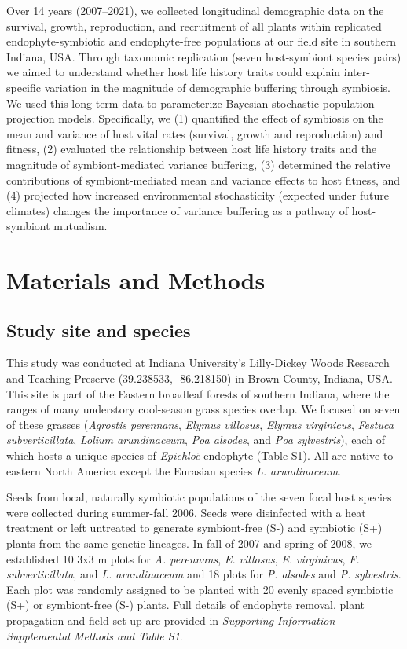 \documentclass[lineno, sn-basic]{sn-jnl}%
\begin{document}
Over 14 years (2007--2021), we collected longitudinal demographic data on the survival, growth, reproduction, and recruitment of all plants within replicated endophyte-symbiotic and endophyte-free populations at our field site in southern Indiana, USA. 
Through taxonomic replication (seven host-symbiont species pairs) we aimed to understand whether host life history traits could explain inter-specific variation in the magnitude of demographic buffering through symbiosis. 
We used this long-term data to parameterize Bayesian stochastic population projection models. 
Specifically, we  (1) quantified the effect of symbiosis on the mean and variance of host vital rates (survival, growth and reproduction) and fitness, (2) evaluated the relationship between host life history traits and the magnitude of symbiont-mediated variance buffering, (3) determined the relative contributions of symbiont-mediated mean and variance effects to host fitness, and (4) projected how increased environmental stochasticity (expected under future climates) changes the importance of variance buffering as a pathway of host-symbiont mutualism. 

\section*{Materials and Methods}
\subsection*{Study site and species}
This study was conducted at Indiana University's Lilly-Dickey Woods Research and Teaching Preserve (39.238533, -86.218150) in Brown County, Indiana, USA. 
This site is part of the Eastern broadleaf forests of southern Indiana, where the ranges of many understory cool-season grass species overlap. 
We focused on seven of these grasses (\emph{Agrostis perennans}, \emph{Elymus villosus}, \emph{Elymus virginicus}, \emph{Festuca subverticillata}, \emph{Lolium arundinaceum}, \emph{Poa alsodes}, and \emph{Poa sylvestris}), each of which hosts a unique species of \emph{Epichlo\"e} endophyte (Table S1). 
All are native to eastern North America except the Eurasian species \emph{L. arundinaceum}.

Seeds from local, naturally symbiotic populations of the seven focal host species were collected during summer-fall 2006. 
Seeds were disinfected with a heat treatment or left untreated to generate symbiont-free (S-) and symbiotic (S+) plants from the same genetic lineages.
In fall of 2007 and spring of 2008, we established 10 3x3 m plots for \emph{A. perennans}, \emph{E. villosus}, \emph{E. virginicus}, \emph{F. subverticillata}, and \emph{L. arundinaceum}  and 18 plots for \emph{P. alsodes} and \emph{P. sylvestris}.
Each plot was randomly assigned to be planted with 20 evenly spaced symbiotic (S+) or symbiont-free (S-) plants.
Full details of endophyte removal, plant propagation and field set-up are provided in \emph{Supporting Information - Supplemental Methods and Table S1}.
\end{document}
